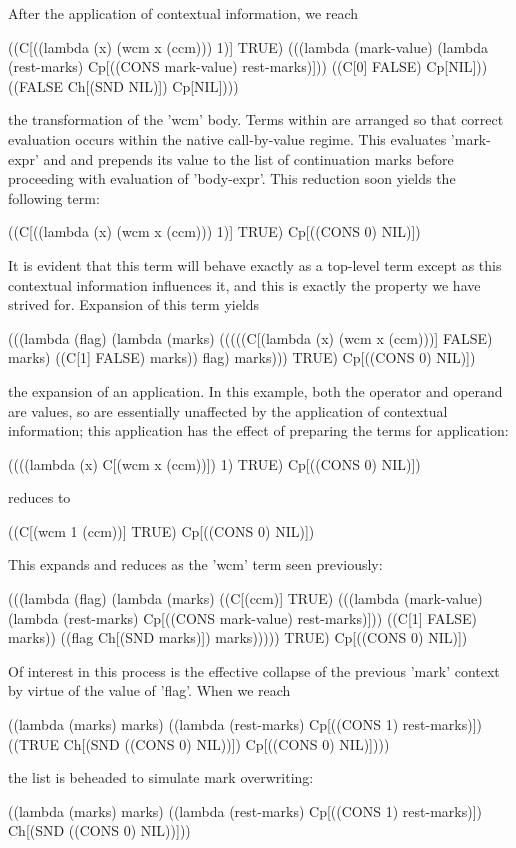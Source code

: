 \documentclass{llncs}
\begin{document}
After the application of contextual information, we reach
\begin{schemedisplay}
((C[((lambda (x) (wcm x (ccm))) 1)] TRUE)
 (((lambda (mark-value) (lambda (rest-marks) Cp[((CONS mark-value) rest-marks)]))
   ((C[0] FALSE) Cp[NIL])) ((FALSE Ch[(SND NIL)]) Cp[NIL])))
\end{schemedisplay}
the transformation of the \scheme'wcm' body. Terms within are arranged so that correct evaluation occurs within the native call-by-value regime. This evaluates \scheme'mark-expr' and and prepends its value to the list of continuation marks before proceeding with evaluation of \scheme'body-expr'. This reduction soon yields the following term:
\begin{schemedisplay}
((C[((lambda (x) (wcm x (ccm))) 1)] TRUE) Cp[((CONS 0) NIL)])
\end{schemedisplay}
It is evident that this term will behave exactly as a top-level term except as this contextual information influences it, and this is exactly the property we have strived for. Expansion of this term yields
\begin{schemedisplay}
(((lambda (flag)
    (lambda (marks)
      (((((C[(lambda (x) (wcm x (ccm)))] FALSE) marks)
         ((C[1] FALSE) marks))
        flag)
       marks))) TRUE) Cp[((CONS 0) NIL)])
\end{schemedisplay}
the expansion of an application. In this example, both the operator and operand are values, so are essentially unaffected by the application of contextual information; this application has the effect of preparing the terms for application:
\begin{schemedisplay}
((((lambda (x) C[(wcm x (ccm))])
   1) TRUE) Cp[((CONS 0) NIL)])
\end{schemedisplay}
reduces to
\begin{schemedisplay}
((C[(wcm 1 (ccm))]
   TRUE) Cp[((CONS 0) NIL)])
\end{schemedisplay}

This expands and reduces as the \scheme'wcm' term seen previously:
\begin{schemedisplay}
(((lambda (flag)
    (lambda (marks)
      ((C[(ccm)] TRUE)
       (((lambda (mark-value) (lambda (rest-marks) Cp[((CONS mark-value) rest-marks)]))
         ((C[1] FALSE) marks))
        ((flag Ch[(SND marks)]) marks)))))
  TRUE) Cp[((CONS 0) NIL)])
\end{schemedisplay}

Of interest in this process is the effective collapse of the previous \scheme'mark' context by virtue of the value of \scheme'flag'. When we reach
\begin{schemedisplay}
((lambda (marks) marks)
 ((lambda (rest-marks) Cp[((CONS 1) rest-marks)])
  ((TRUE Ch[(SND ((CONS 0) NIL))]) Cp[((CONS 0) NIL)])))
\end{schemedisplay}
the list is beheaded to simulate mark overwriting:
\begin{schemedisplay}
((lambda (marks) marks)
 ((lambda (rest-marks) Cp[((CONS 1) rest-marks)])
  Ch[(SND ((CONS 0) NIL))]))
\end{schemedisplay}
\end{document}
